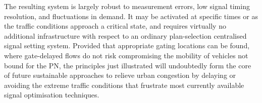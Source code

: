 The resulting system is largely robust to measurement errors, low signal timing resolution,
and fluctuations in demand. It may be activated at specific times or as the traffic conditions
approach a critical state, and requires virtually no additional infrastructure with respect to an
ordinary plan-selection centralised signal setting system. Provided that appropriate gating
locations can be found, where gate-delayed flows do not risk compromising the mobility of
vehicles not bound for the PN, the principles just illustrated will undoubtedly form the core of
future sustainable approaches to relieve urban congestion by delaying or avoiding the extreme
traffic conditions that frustrate most currently available signal optimisation techniques.











